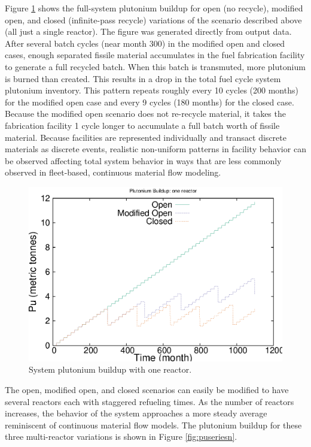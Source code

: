 Figure \ref{fig:puseries1} shows the full-system plutonium buildup for open
(no recycle), modified open, and closed (infinite-pass recycle) variations of
the scenario described above (all just a single reactor).  The figure was
generated directly from \Cyclus output data. After several batch cycles (near
month 300) in the modified open and closed cases, enough separated fissile
material accumulates in the fuel fabrication facility to generate a full
recycled batch.  When this batch is transmuted, more plutonium is burned than
created.  This results in a drop in the total fuel cycle system plutonium
inventory.  This pattern repeats roughly every 10 cycles (200 months) for the
modified open case and every 9 cycles (180 months) for the closed case.
Because the modified open scenario does not re-recycle material, it takes the
fabrication facility 1 cycle longer to accumulate a full batch worth of
fissile material.  Because facilities are represented individually and
transact discrete materials as discrete events, realistic non-uniform patterns
in facility behavior can be observed affecting total system behavior in ways
that are less commonly observed in fleet-based, continuous material flow
modeling.

\begin{figure}[H]
\label{fig:puseries1}
\caption{System plutonium buildup with one reactor.}
\begin{center}
\includegraphics{./images/puseries-1.eps}
\end{center}
\end{figure}

The open, modified open, and closed scenarios can easily be modified to have
several reactors each with staggered refueling times.  As the number of
reactors increases, the behavior of the system approaches a more steady
average reminiscent of continuous material flow models.  The plutonium buildup
for these three multi-reactor variations is shown in Figure
\ref{fig:puseriesn}.

